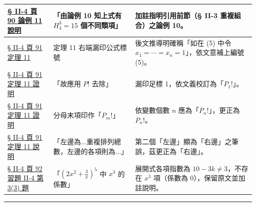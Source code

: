 \documentclass[a4paper,12pt,twoside]{article}
\begin{document}
\begin{xltabular}{\textwidth}{|p{3.2cm}|p{3.8cm}|X|}
\hyperref[note:b5-ch2-p90-disc10]{§ II-4 頁 90 論例 11 說明} & 
「由論例 10 知上式有 $H_4^3 = 15$ 個不同類項」 & 
加註指明引用前節（§ II-3 重複組合）之論例 10。 \\ \hline

\hyperref[note:b5-ch2-p91-eq5]{§ II-4 頁 91 定理 11} & 
定理 11 右端漏印公式標號 & 
後文推導明確稱「如在 (5) 中令 $x_1 = \cdots = x_n = 1$」，依文意補上編號 (5)。 \\ \hline

\hyperref[note:b5-ch2-p91-p1]{§ II-4 頁 91 定理 11 證明} & 
「故應用 $P!$ 去除」 & 
漏印足標 1，依文義校訂為「$P_1!$」。 \\ \hline

\hyperref[note:b5-ch2-p91-pm]{§ II-4 頁 91 定理 11 證明} & 
分母末項印作「$P_m!$」 & 
依變數個數 $n$ 應為「$P_n!$」，更正為 $P_n!$。 \\ \hline

\hyperref[note:b5-ch2-p91-right]{§ II-4 頁 91 定理 11 說明} & 
「左邊為...重複排列總數，左邊的各項則為...」 & 
第二個「左邊」顯為「右邊」之筆誤，茲更正為「右邊」。 \\ \hline

\hyperref[note:b5-ch2-p92-q3-3]{§ II-4 頁 92 習題 II-4 第 3(3) 題} & 
「$\left(2x^2 + \frac{3}{x}\right)^5$ 中 $x^3$ 的係數」 & 
展開式各項指數為 $10-3k \ne 3$，不存在 $x^3$ 項（係數為 0），保留原文並加註說明。 \\ \hline

\end{xltabular}

\vspace{1em}
\hrule
\vspace{1em}

\tableofcontents
\newpage


\end{document}
